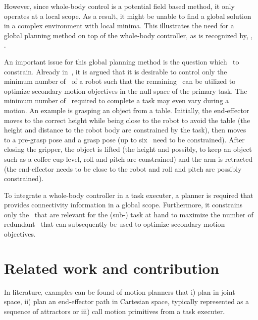 However, since whole-body control is a potential field based method, it only operates at a local scope. As a result, it might be unable to find a global solution in a complex environment with local minima. This illustrates the need for a global planning method on top of the whole-body controller, as is recognized by, \eg, \citet{Yang2006,Toussaint2007,Behnisch2010,Behnisch2011,Dietrich2012}.

An important issue for this global planning method is the question which \dofs\ to constrain. 
Already in~\citet{Nakanishi2007}, it is argued that it is desirable to control only the minimum number of \dofs\ of a robot such that the remaining \dofs\ can be utilized to optimize secondary motion objectives in the null space of the primary task. %
The minimum number of \dofs\ required to complete a task may even vary during a motion. 
An example is grasping an object from a table. Initially, the end-effector moves to the correct height while being close to the robot to avoid the table (the height and distance to the robot body are constrained by the task), then moves to a pre-grasp pose and a grasp pose (up to six \dofs\ need to be constrained). After closing the gripper, the object is lifted (the height and possibly, to keep an object such as a coffee cup level, roll and pitch are constrained) and the arm is retracted (the end-effector needs to be close to the robot and roll and pitch are possibly constrained).

To integrate a whole-body controller in a task executer, a planner is required that provides connectivity information in a global scope. Furthermore, it constrains only the \dofs\ that are relevant for the (sub-) task at hand to maximize the number of redundant \dofs\ that can subsequently be used to optimize secondary motion objectives.

\section{Related work and contribution}
In literature, examples can be found of motion planners that i) plan in joint space, ii) plan an end-effector path in Cartesian space, typically represented as a sequence of attractors or iii) call motion primitives from a task executer.


